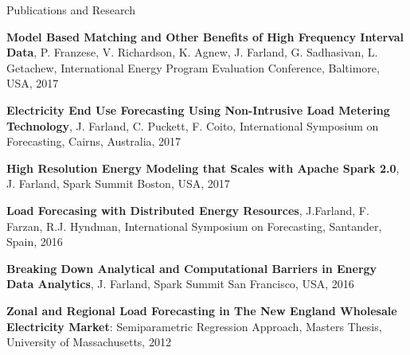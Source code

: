 \documentclass{resume} %
\begin{document}
\begin{rSection}{Publications and Research}

\item {\bf Model Based Matching and Other Benefits of High Frequency Interval Data}, P. Franzese, V. Richardson, K. Agnew, J. Farland, G. Sadhasivan, L. Getachew, International Energy Program Evaluation Conference, Baltimore, USA, 2017
\item {\bf Electricity End Use Forecasting Using Non-Intrusive Load Metering Technology}, J. Farland, C. Puckett, F. Coito, International Symposium on Forecasting, Cairns, Australia, 2017

\item {\bf High Resolution Energy Modeling that Scales with Apache Spark 2.0}, J. Farland, Spark Summit Boston, USA, 2017

\item {\bf Load Forecasing with Distributed Energy Resources}, J.Farland, F. Farzan, R.J. Hyndman, International Symposium on Forecasting, Santander, Spain, 2016

\item {\bf Breaking Down Analytical and Computational Barriers in Energy Data Analytics}, J. Farland, Spark Summit San Francisco, USA, 2016

\item {\bf  Zonal and Regional Load Forecasting in The New England Wholesale Electricity Market}: Semiparametric Regression Approach, Masters Thesis, University of Massachusetts, 2012


\end{rSection}


\end{document}
